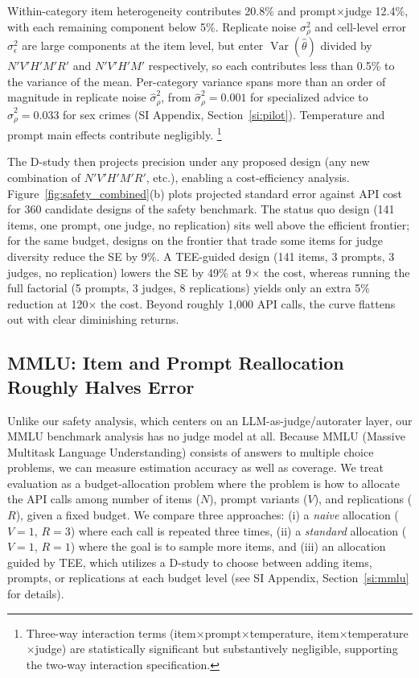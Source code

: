 \documentclass{article}
\DeclareMathOperator{\Var}{Var}
\begin{document}
Within-category item heterogeneity contributes 20.8\% and prompt$\times$judge 12.4\%, with each remaining component below 5\%. Replicate noise $\sigma^2_\rho$ and cell-level error $\sigma^2_\epsilon$ are large components at the item level, but enter $\Var(\hat\theta)$ divided by $N'V'H'M'R'$ and $N'V'H'M'$ respectively, so each contributes less than 0.5\% to the variance of the mean. Per-category variance spans more than an order of magnitude in replicate noise $\hat{\sigma}^2_\rho$, from $\hat{\sigma}^2_\rho = 0.001$ for specialized advice to $\hat{\sigma}^2_\rho = 0.033$ for sex crimes (SI Appendix, Section~\ref{si:pilot}).
Temperature and prompt main effects contribute negligibly. \footnote{Three-way interaction terms (item$\times$prompt$\times$temperature, item$\times$temperature$\times$judge) are statistically significant but substantively negligible, supporting the two-way interaction specification.} 


The D-study then projects precision under any proposed design (any new combination of $N'V'H'M'R'$, etc.), enabling a cost-efficiency analysis. Figure~\ref{fig:safety_combined}(b) plots projected standard error against API cost for 360 candidate designs of the safety benchmark. The status quo design (141 items, one prompt, one judge, no replication) sits well above the efficient frontier; for the same budget, designs on the frontier that trade some items for judge diversity reduce the SE by 9\%. A TEE-guided design (141 items, 3 prompts, 3 judges, no replication) lowers the SE by 49\% at 9$\times$ the cost, whereas running the full factorial (5 prompts, 3 judges, 8 replications) yields only an extra 5\% reduction at 120$\times$ the cost. Beyond roughly 1,000 API calls, the curve flattens out with clear diminishing returns.



\subsection{MMLU: Item and Prompt Reallocation Roughly Halves Error}
\label{sec:mmlu}

Unlike our safety analysis, which centers on an LLM-as-judge/autorater layer, our MMLU benchmark analysis has no judge model at all. Because MMLU (Massive Multitask Language Understanding) \citep{hendrycks2021mmlu} consists of answers to multiple choice problems, we can measure estimation accuracy as well as coverage. We treat evaluation as a budget-allocation problem where the problem is how to allocate the API calls among number of items ($N$), prompt variants ($V$), and replications ($R$), given a fixed budget. We compare three approaches: (i) a \emph{naive} allocation ($V\!=\!1$, $R\!=\!3$) where each call is repeated three times, (ii) a \emph{standard} allocation ($V\!=\!1$, $R\!=\!1$) where the goal is to sample more items, and (iii) an allocation guided by TEE, which utilizes a D-study to choose between adding items, prompts, or replications at each budget level (see SI Appendix, Section~\ref{si:mmlu} for details).
\end{document}
